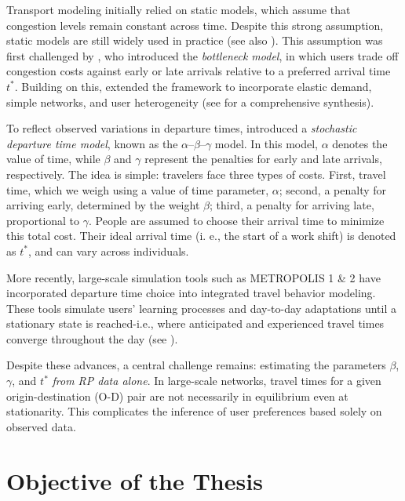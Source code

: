 Transport modeling initially relied on static models, which assume that congestion levels remain constant across time. Despite this strong assumption, static models are still widely used in practice (see also \textcite{duranton2011fundamental}). This assumption was first challenged by \textcite{Vickrey1963, Vickrey1969}, who introduced the \textit{bottleneck model}, in which users trade off congestion costs against early or late arrivals relative to a preferred arrival time \( t^* \). Building on this, \textcite{arnott1993structural} extended the framework to incorporate elastic demand, simple networks, and user heterogeneity (see \textcite{Li2020} for a comprehensive synthesis).

To reflect observed variations in departure times, \textcite{de1983stochastic} introduced a \textit{stochastic departure time model}, known as the \(\alpha\)–\(\beta\)–\(\gamma\) model. In this model, \(\alpha\) denotes the value of time, while \(\beta\) and \(\gamma\) represent the penalties for early and late arrivals, respectively. The idea is simple: travelers face three types of costs. First, travel time, which we weigh using a value of time parameter,  \(\alpha\);
second, a penalty for arriving early, determined by the weight \(\beta\);
third, a penalty for arriving late, proportional to \(\gamma\).
People are assumed to choose their arrival time to minimize this total cost.
Their ideal arrival time (i. e., the start of a work shift) is denoted as $t^*$, and can vary across individuals. 

More recently, large-scale simulation tools such as METROPOLIS 1 \& 2 have incorporated departure time choice into integrated travel behavior modeling. These tools simulate users' learning processes and day-to-day adaptations until a stationary state is reached-i.e., where anticipated and experienced travel times converge throughout the day (see \textcite{javaudin2024metropolis2}).

Despite these advances, a central challenge remains: estimating the parameters \(\beta\), \(\gamma\), and \( t^* \) \textit{from RP data alone}. In large-scale networks, travel times for a given origin-destination (O-D) pair are not necessarily in equilibrium even at stationarity. This complicates the inference of user preferences based solely on observed data.

\section{Objective of the Thesis}

